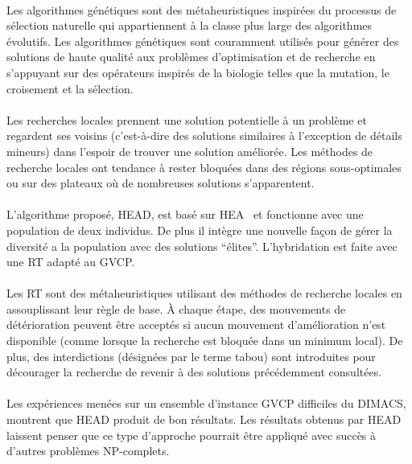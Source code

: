 \documentclass[a4paper,11pt,twoside,french,report]{../common/simplem}
\begin{document}
				\paragraph*{}
					Les algorithmes génétiques sont des métaheuristiques inspirées du processus de sélection naturelle qui appartiennent à la classe plus large des algorithmes évolutifs. Les algorithmes génétiques sont couramment utilisés pour générer des solutions de haute qualité aux problèmes d'optimisation et de recherche en s'appuyant sur des opérateurs inspirés de la biologie telles que la mutation, le croisement et la sélection.
				\paragraph*{}
					Les recherches locales prennent une solution potentielle à un problème et regardent ses voisins (c'est-à-dire des solutions similaires à l'exception de détails mineurs) dans l'espoir de trouver une solution améliorée. Les méthodes de recherche locales ont tendance à rester bloquées dans des régions sous-optimales ou sur des plateaux où de nombreuses solutions s'apparentent.
				\paragraph*{}
					L'algorithme proposé, \gls{HEAD}, est basé sur \gls{HEA}~\cite{Galinier1999} et fonctionne avec une population de deux individus. De plus il intègre une nouvelle façon de gérer la diversité a la population avec des solutions ``élites''. L'hybridation est faite avec une \gls{RT} adapté au \gls{GVCP}.
				\paragraph*{}
					Les \gls{RT} sont des métaheuristiques utilisant des méthodes de recherche locales en assouplissant leur règle de base. À chaque étape, des mouvements de détérioration peuvent être acceptés si aucun mouvement d'amélioration n'est disponible (comme lorsque la recherche est bloquée dans un minimum local). De plus, des interdictions (désignées par le terme tabou) sont introduites pour décourager la recherche de revenir à des solutions précédemment consultées.
				\paragraph*{}
					Les expériences menées sur un ensemble d'instance \gls{GVCP} difficiles du \gls{DIMACS}, montrent que \gls{HEAD} produit de bon résultats. Les résultats obtenus par \gls{HEAD} laissent penser que ce type d'approche pourrait être appliqué avec succès à d'autres problèmes \acrshort{NP}-complets.
\end{document}
